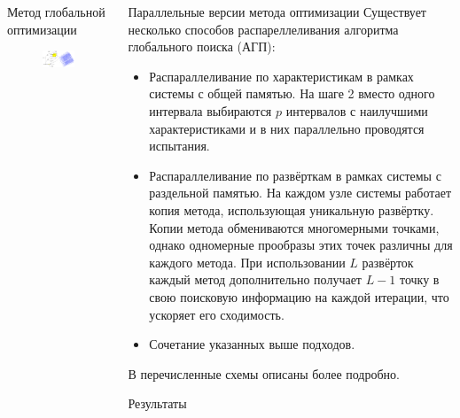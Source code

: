 \documentclass{beamer}
\begin{document}
\begin{frame}[t]
\begin{columns}[t]
\begin{column}[t]{0.48\paperwidth}
\begin{block}{Метод глобальной оптимизации}
              \begin{minipage}[t]{.48\textwidth}
              \begin{figure}
                  \centering
                  \includegraphics[scale=1.27]{images/peano.png}
              \end{figure}
              \end{minipage}
            \end{block}
        \end{column}
        \begin{column}[t]{0.48\paperwidth}
          \begin{block}{Параллельные версии метода оптимизации}
            Существует несколько способов распареллеливания алгоритма глобального поиска (АГП):
            \begin{itemize}
              \justifying
              \item Распараллеливание по характеристикам в рамках системы с общей памятью.
              На шаге 2 вместо одного интервала выбираются \(p\) интервалов с наилучшими характеристиками и в них параллельно проводятся испытания.
              \item Распараллеливание по развёрткам в рамках системы с раздельной памятью. На каждом узле системы работает копия метода, использующая
              уникальную развёртку. Копии метода обмениваются многомерными точками, однако одномерные прообразы этих точек различны для каждого метода.
              При использовании \(L\) развёрток каждый метод дополнительно получает \(L-1\) точку в свою поисковую информацию на каждой итерации, что
              ускоряет его сходимость.
              \item Сочетание указанных выше подходов.
            \end{itemize}
          В \cite{optParallelBook} перечисленные схемы описаны более подробно.
          \end{block}
          \begin{block}{Результаты}
						

\end{block}
\end{column}
\end{columns}
\end{frame}
\end{document}
